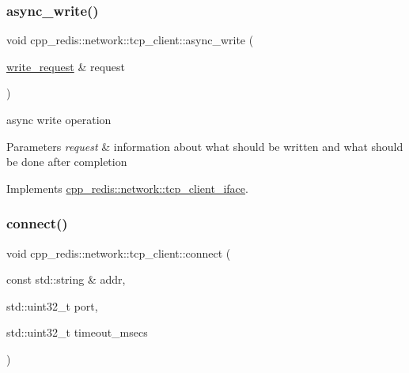 \mbox{\label{classcpp__redis_1_1network_1_1tcp__client_a6d15785b71776cd85426c9634cb446f0}} 
\subsubsection{\texorpdfstring{async\+\_\+write()}{async\_write()}}
{\footnotesize\ttfamily void cpp\+\_\+redis\+::network\+::tcp\+\_\+client\+::async\+\_\+write (\begin{DoxyParamCaption}\item[{\mbox{\hyperlink{structcpp__redis_1_1network_1_1tcp__client__iface_1_1write__request}{write\+\_\+request}} \&}]{request }\end{DoxyParamCaption})\hspace{0.3cm}{\ttfamily [virtual]}}

async write operation


\begin{DoxyParams}{Parameters}
{\em request} & information about what should be written and what should be done after completion \\
\hline
\end{DoxyParams}


Implements \mbox{\hyperlink{classcpp__redis_1_1network_1_1tcp__client__iface_a9cd01e8a68479456d15d6435ffad9b92}{cpp\+\_\+redis\+::network\+::tcp\+\_\+client\+\_\+iface}}.

\mbox{\label{classcpp__redis_1_1network_1_1tcp__client_a5808c0569980d83479f755ac55a12dfb}} 
\subsubsection{\texorpdfstring{connect()}{connect()}}
{\footnotesize\ttfamily void cpp\+\_\+redis\+::network\+::tcp\+\_\+client\+::connect (\begin{DoxyParamCaption}\item[{const std\+::string \&}]{addr,  }\item[{std\+::uint32\+\_\+t}]{port,  }\item[{std\+::uint32\+\_\+t}]{timeout\+\_\+msecs }\end{DoxyParamCaption})\hspace{0.3cm}{\ttfamily [virtual]}}

